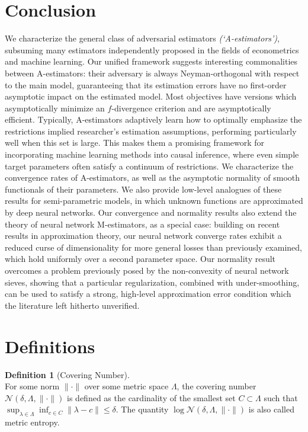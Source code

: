\documentclass[12pt]{article}
\theoremstyle{myplain}
\theoremstyle{definition}
\theoremstyle{definition}
\newtheorem{definition}{Definition}
\theoremstyle{remark}
\numberwithin{equation}{section}
\begin{document}
\section{Conclusion}
We characterize the general class of adversarial estimators {\it (`A-estimators')}, subsuming many estimators independently proposed in the fields of econometrics and machine learning. Our unified framework suggests interesting commonalities between A-estimators: their adversary is always Neyman-orthogonal with respect to the main model, guaranteeing that its estimation errors have no first-order asymptotic impact on the estimated model. Most objectives have versions which asymptotically minimize an $f$-divergence criterion and are asymptotically efficient. Typically, A-estimators adaptively learn how to optimally emphasize the restrictions implied researcher's estimation assumptions, performing particularly well when this set is large. This makes them a promising framework for incorporating machine learning methods into causal inference, where even simple target parameters often satisfy a continuum of restrictions. We characterize the convergence rates of A-estimators, as well as the asymptotic normality of smooth functionals of their parameters. We also provide low-level analogues of these results for semi-parametric models, in which unknown functions are approximated by deep neural networks. Our convergence and normality results also extend the theory of neural network M-estimators, as a special case: building on recent results in approximation theory, our neural network converge rates exhibit a reduced curse of dimensionality for more general losses than previously examined, which hold uniformly over a second parameter space. Our normality result overcomes a problem previously posed by the non-convexity of neural network sieves, showing that a particular regularization, combined with under-smoothing, can be used to satisfy a strong, high-level approximation error condition which the literature left hitherto unverified. 



\appendix
\singlespacing
\section{Definitions}
\label{appendix:definitions}
\begin{definition}[Covering Number]\label{def:coveringnumber}\ \\ 
For some norm $\|\cdot\|$ over some metric space $\Lambda$, the covering number $\mathcal{N}(\delta, \Lambda, \|\cdot\|)$ is defined as the cardinality of the smallest set $C\subset\Lambda$ such that $\sup_{\lambda\in \Lambda}\inf_{c\in C} \|\lambda-c\|\leq\delta$. The quantity $
\log\mathcal{N}(\delta, \Lambda, \|\cdot\|)$ is also called metric entropy.
\end{definition}
\end{document}
